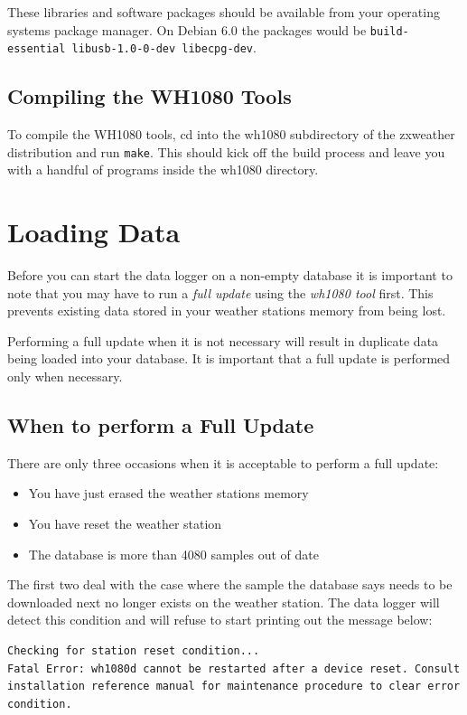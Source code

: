 \documentclass[a4paper,10pt,draft]{book}
\begin{document}
These libraries and software packages should be available from your operating systems package manager. On Debian 6.0 the packages would be \verb|build-essential libusb-1.0-0-dev libecpg-dev|.

\subsection{Compiling the WH1080 Tools}


To compile the WH1080 tools, cd into the wh1080 subdirectory of the zxweather distribution and run \verb|make|. This should kick off the build process and leave you with a handful of programs inside the wh1080 directory.

\section{Loading Data}
\label{sec_loading_data}

Before you can start the data logger on a non-empty database it is important to note that you may have to run a \emph{full update} using the \emph{wh1080 tool} first. This prevents existing data stored in your weather stations memory from being lost.

Performing a full update when it is not necessary will result in duplicate data being loaded into your database. It is important that a full update is performed only when necessary.

\subsection{When to perform a Full Update}
There are only three occasions when it is acceptable to perform a full update:
\begin{itemize}
\item You have just erased the weather stations memory
\item You have reset the weather station
\item The database is more than 4080 samples out of date
\end{itemize}

The first two deal with the case where the sample the database says needs to be downloaded next no longer exists on the weather station. The data logger will detect this condition and will refuse to start printing out the message below:
\begin{verbatim}
Checking for station reset condition...
Fatal Error: wh1080d cannot be restarted after a device reset. Consult 
installation reference manual for maintenance procedure to clear error
condition.
\end{verbatim}
\end{document}
